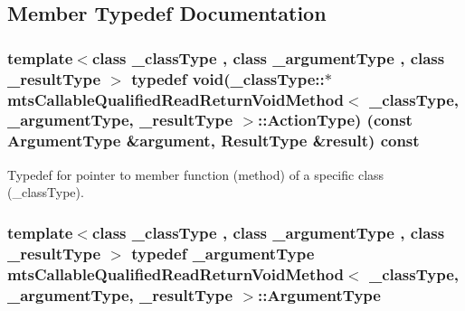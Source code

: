 \subsection{Member Typedef Documentation}
\hypertarget{classmts_callable_qualified_read_return_void_method_a90bf5eae1c7fdee0396313ce6de022bb}{}
\subsubsection[{Action\+Type}]{\setlength{\rightskip}{0pt plus 5cm}template$<$class \+\_\+class\+Type , class \+\_\+argument\+Type , class \+\_\+result\+Type $>$ typedef void(\+\_\+class\+Type\+::$\ast$ {\bf mts\+Callable\+Qualified\+Read\+Return\+Void\+Method}$<$ \+\_\+class\+Type, \+\_\+argument\+Type, \+\_\+result\+Type $>$\+::Action\+Type) (const {\bf Argument\+Type} \&argument, {\bf Result\+Type} \&result) const }\label{classmts_callable_qualified_read_return_void_method_a90bf5eae1c7fdee0396313ce6de022bb}
Typedef for pointer to member function (method) of a specific class (\+\_\+class\+Type). \hypertarget{classmts_callable_qualified_read_return_void_method_a6edb7e6ad0ead0f74cfe2751d45532c5}{}
\subsubsection[{Argument\+Type}]{\setlength{\rightskip}{0pt plus 5cm}template$<$class \+\_\+class\+Type , class \+\_\+argument\+Type , class \+\_\+result\+Type $>$ typedef \+\_\+argument\+Type {\bf mts\+Callable\+Qualified\+Read\+Return\+Void\+Method}$<$ \+\_\+class\+Type, \+\_\+argument\+Type, \+\_\+result\+Type $>$\+::{\bf Argument\+Type}}\label{classmts_callable_qualified_read_return_void_method_a6edb7e6ad0ead0f74cfe2751d45532c5}
\hypertarget{classmts_callable_qualified_read_return_void_method_ac485c35956ba406a7863f66264b290d4}{}
